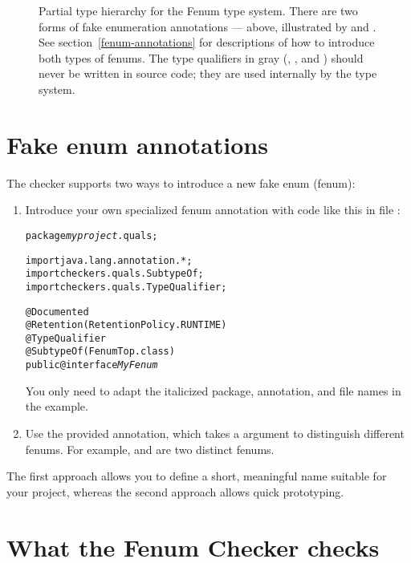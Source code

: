 \begin{figure}
\caption{Partial type hierarchy for the Fenum type system.
There are two forms of fake enumeration annotations --- above, illustrated
by  and .
See section~\ref{fenum-annotations} for descriptions of how to
introduce both types of fenums. The type qualifiers in gray
(, , and )
should never be written in
source code; they are used internally by the type system.}
\label{fig-fenum-hierarchy}
\end{figure}

\section{Fake enum annotations\label{fenum-annotations}}

The checker supports two ways to introduce a new fake enum (fenum):

\begin{enumerate}
\item Introduce your own specialized fenum annotation with code like this in
file :

\begin{alltt}
package \textit{myproject}.quals;

import java.lang.annotation.*;
import checkers.quals.SubtypeOf;
import checkers.quals.TypeQualifier;

@Documented
@Retention(RetentionPolicy.RUNTIME)
@TypeQualifier
@SubtypeOf( \ttlcb{} FenumTop.class \ttrcb{} )
public @interface \textit{MyFenum} \ttlcb\ttrcb
\end{alltt}

You only need to adapt the italicized package, annotation, and file names in the example.


\item Use the provided  annotation, which takes a
 argument to distinguish different fenums.
For example,  and  are two distinct fenums.
\end{enumerate}


The first approach allows you to define a short, meaningful name suitable for
your project, whereas the second approach allows quick prototyping.



\section{What the Fenum Checker checks\label{fenum-checks}}

